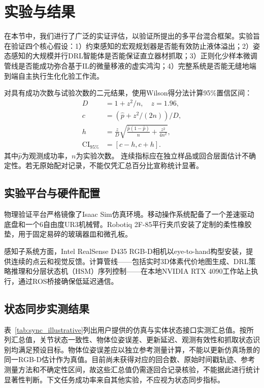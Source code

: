 \section{实验与结果}
\label{sec:experiments}

在本节中，我们进行了广泛的实证评估，以验证所提出的多平台混合框架。实验旨在验证四个核心假设：1）约束感知的宏观规划器是否能有效防止液体溢出；2）姿态感知的大规模并行DRL智能体是否能保证直立器材抓取；3）正则化少样本微调管线是否能成功弥合基于IL的微量移液的虚实鸿沟；4）完整系统是否能无缝地端到端自主执行生化化验工作流。

对具有成功次数与试验次数的二元结果，使用Wilson得分法计算95\%置信区间：
\begin{equation}
    \begin{aligned}
    D &= 1+z^2/n,\quad z=1.96,\\
    c &= (\hat p+z^2/(2n))/D,\\
    h &= \frac{z}{D}\sqrt{\frac{\hat p(1-\hat p)}{n}+\frac{z^2}{4n^2}},\\
    \text{CI}_{95\%} &= [c-h,c+h].
    \end{aligned}
\end{equation}
其中$\hat{p}$为观测成功率，$n$为实验次数。
连续指标应在独立样品或回合层面估计不确定性。若无原始配对记录，不能仅凭汇总百分比宣称统计显著。

\subsection{实验平台与硬件配置}
\label{subsec:exp_setup}

物理验证平台严格镜像了Isaac Sim仿真环境。移动操作系统配备了一个差速驱动底盘和一个6自由度UR3机械臂。Robotiq 2F-85平行夹爪安装了定制的柔性橡胶垫，用于固定易碎的玻璃器皿和微孔板。

感知子系统方面，Intel RealSense D435 RGB-D相机以eye-to-hand构型安装，提供连续的点云和视觉反馈。计算管线——包括实时3D体素代价地图生成、DRL策略推理和分层状态机（HSM）序列控制——在本地NVIDIA RTX 4090工作站上执行，通过ROS桥接确保低延迟通信。

\subsection{状态同步实测结果}
\label{subsec:state_sync_eval}
表~\ref{tab:sync_illustrative}列出用户提供的仿真与实体状态接口实测汇总值。按所列汇总值，关节状态一致性、物体位姿误差、更新延迟、观测有效性和抓取状态识别均满足预设目标。物体位姿误差应以独立参考测量计算，不能以更新仿真场景的同一RGB-D估计作为真值。目前尚未获得对应的回合数、原始时间戳轨迹、参考测量方法和不确定性区间，故这些汇总值仍需逐回合记录核验，不能据此进行统计显著性判断。下文任务成功率来自其他实验，不应视为状态同步指标。

